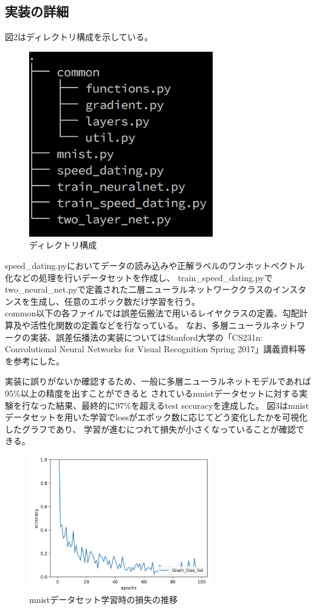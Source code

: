 \documentclass[uplatex]{jsarticle}
\begin{document}
\subsection{実装の詳細}
図2はディレクトリ構成を示している。
\begin{figure}
  \begin{center}
    \includegraphics[width=8cm]{img/directory.png}
    \caption{ディレクトリ構成}
  \end{center}
\end{figure}
speed\_dating.pyにおいてデータの読み込みや正解ラベルのワンホットベクトル化などの処理を行いデータセットを作成し、
train\_speed\_dating.pyでtwo\_neural\_net.pyで定義された二層ニューラルネットワーククラスのインスタンスを生成し、任意のエポック数だけ学習を行う。\\
common以下の各ファイルでは誤差伝搬法で用いるレイヤクラスの定義、勾配計算及や活性化関数の定義などを行なっている。
なお、多層ニューラルネットワークの実装、誤差伝播法の実装についてはStanford大学の「CS231n: Convolutional Neural Networks for Visual Recognition
Spring 2017」講義資料等を参考にした。

実装に誤りがないか確認するため、一般に多層ニューラルネットモデルであれば95\%以上の精度を出すことができると
されているmnistデータセットに対する実験を行なった結果、最終的に97\%を超えるtest sccuracyを達成した。
図3はmnistデータセットを用いた学習でlossがエポック数に応じてどう変化したかを可視化したグラフであり、
学習が進むにつれて損失が小さくなっていることが確認できる。
\begin{figure}
  \begin{center}
    \includegraphics[width=8cm]{img/mnist.png}
    \caption{mnistデータセット学習時の損失の推移}
  \end{center}
\end{figure}
\end{document}
